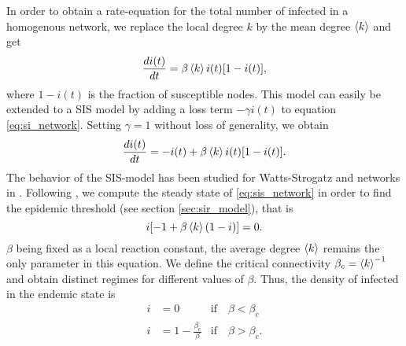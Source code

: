 \documentclass[openright,twoside,headsepline]{scrbook}
\begin{document}
In order to obtain a rate-equation for the total number of infected in a homogenous network, we replace the local degree $k$ by the mean degree $\left< k \right>$ and get
\begin{equation}\label{eq:si_network}
\frac{di(t)}{dt}=\beta \left< k \right> i(t) [1-i(t)],
\end{equation}
where $1-i(t)$ is the fraction of susceptible nodes.
This model can easily be extended to a SIS model by adding a loss term $-\gamma i(t)$ to equation \eqref{eq:si_network}.
Setting $\gamma =1 $ without loss of generality, we obtain 
\begin{equation}\label{eq:sis_network}
\frac{di(t)}{dt}=-i(t)+ \beta \left< k \right> i(t) [1-i(t)] .
\end{equation}
The behavior of the SIS-model has been studied for Watts-Strogatz and \BA networks in \citep{Pastor-Satorras_vespi:2001}.
Following \citeauthor{Pastor-Satorras_vespi:2001}, we compute the steady state of \eqref{eq:sis_network} in order to find the epidemic threshold (see section \ref{sec:sir_model}), that is
\[
i[-1+\beta \left< k \right> (1-i)]=0.
\]
$\beta $ being fixed as a local reaction constant, the average degree $\left< k \right>$ remains the only parameter in this equation.
We define the critical connectivity $\beta _c=\left< k \right>^{-1}$ and obtain distinct regimes for different values of $\beta $.
Thus, the density of infected in the endemic state is
\begin{align}\label{eq:endemic_ws}
i&=0   &\text{if} \quad \beta < \beta _c \nonumber \\
i &=1-\frac{\beta _c}{\beta }  &\text{if} \quad \beta > \beta _c .
\end{align}
\end{document}
